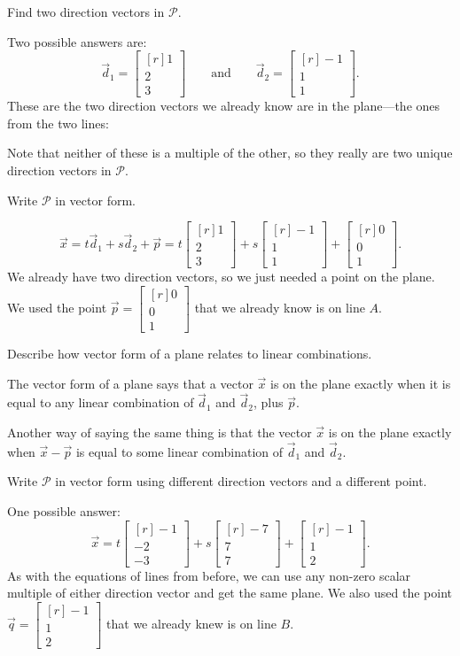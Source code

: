 \documentclass{problemset}
\newcommand{\mat}[1]{\begin{bmatrix*}[r]#1\end{bmatrix*}}
\begin{document}
	\begin{parts}
		\item Find two direction vectors in $\mathcal P$.
			\begin{solution}
				Two possible answers are:
				\[
					\vec d_1 = \mat{1\\2\\3}
					\qquad \text{and} \qquad
					\vec d_2 = \mat{-1\\1\\1}.
				\]
				These are the two direction vectors we already know are in the
				plane---the ones from the two lines:

				Note that neither of these is a multiple of the other, so they
				really are two unique direction vectors in $\mathcal P$.
			\end{solution}
		\item Write $\mathcal P$ in vector form.
			\begin{solution}
				\[
					\vec x = t\vec d_1 +s\vec d_2+\vec p
					= t \mat{1\\2\\3} + s \mat{-1\\1\\1} + \mat{0\\0\\1}.
				\]
				We already have two direction vectors, so we just needed a point
				on the plane. We used the point $\vec p = \mat{0\\0\\1}$
				that we already know is on line $A$.
			\end{solution}
		\item Describe how vector form of a plane relates to linear
			combinations.
			\begin{solution}
				The vector form of a plane says that a vector $\vec x$ is on the
				plane exactly when it is equal to any linear combination of
				$\vec d_1$ and $\vec d_2$, plus $\vec p$.

				Another way of saying
				the same thing is that the vector $\vec x$ is on the plane
				exactly when $\vec x - \vec p$ is equal	to some linear
				combination of $\vec d_1$ and $\vec d_2$.
			\end{solution}
		\item Write $\mathcal P$ in vector form using different
			direction vectors and a different point.
			\begin{solution}
				One possible answer:
				\[
					\vec x = t\mat{-1\\-2\\-3}+s\mat{-7\\7\\7}+\mat{-1\\1\\2}.
				\]
				As with the equations of lines from before, we can use any
				non-zero scalar multiple of either direction vector and get the
				same plane. We also used the point $\vec q = \mat{-1\\1\\2}$
				that we already knew is on line $B$.
			\end{solution}
	\end{parts}
\end{document}

